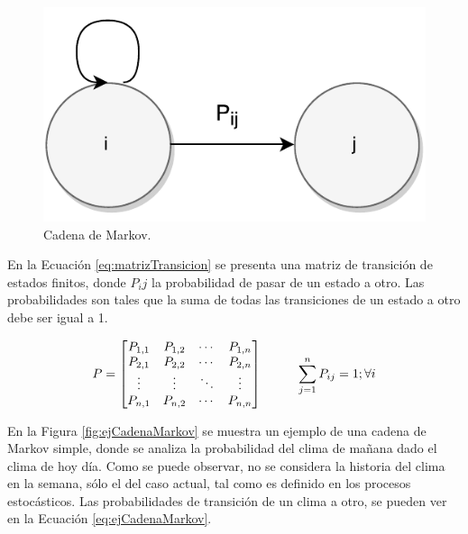 \begin{figure}[ht!]
  \centering
    \includegraphics[scale=0.6]{images/CadenaMarkov.pdf}
  \caption{Cadena de Markov.}
  \label{fig:cadenaMarkov}
\end{figure}

En la Ecuación \ref{eq:matrizTransicion} se presenta una matriz de transición de estados finitos, \normalsize{donde} $P_ij$ \normalsize{la probabilidad de pasar de un estado a otro. Las probabilidades son tales que la suma de todas las transiciones de un estado a otro debe ser igual a 1.}

\begin{equation} \label{eq:matrizTransicion}
	P =
	\begin{bmatrix}
		P_{1,1} & P_{1,2} & \cdots & P_{1,n} \\
		P_{2,1} & P_{2,2} & \cdots & P_{2,n} \\
		\vdots  & \vdots  & \ddots & \vdots  \\
		P_{n,1} & P_{n,2} & \cdots & P_{n,n} \\
	\end{bmatrix}
	\hspace*{1cm} \sum_{j=1}^{n} P_{ij} = 1 ; \forall i
\end{equation}

En la Figura \ref{fig:ejCadenaMarkov} se muestra un ejemplo de una cadena de Markov simple, donde se analiza la probabilidad del clima de mañana dado el clima de hoy día. Como se puede observar, no se considera la historia del clima en la semana, sólo el del caso actual, tal como es definido en los procesos estocásticos. Las probabilidades \normalsize{de transición} de un clima a otro, se pueden ver en la Ecuación \ref{eq:ejCadenaMarkov}.

